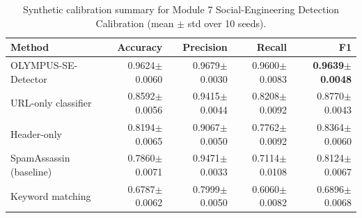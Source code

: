 \begin{table}[h]
\centering
\caption{Synthetic calibration summary for Module 7 Social-Engineering Detection Calibration (mean $\pm$ std over 10 seeds).}
\label{tab:module7_social_engineering}
\begin{tabular}{lrrrr}
\toprule
Method & Accuracy & Precision & Recall & F1 \\
\midrule
OLYMPUS-SE-Detector & 0.9624$\pm$0.0060 & 0.9679$\pm$0.0030 & 0.9600$\pm$0.0083 & \textbf{0.9639$\pm$0.0048} \\
URL-only classifier & 0.8592$\pm$0.0056 & 0.9415$\pm$0.0044 & 0.8208$\pm$0.0092 & 0.8770$\pm$0.0043 \\
Header-only & 0.8194$\pm$0.0065 & 0.9067$\pm$0.0050 & 0.7762$\pm$0.0092 & 0.8364$\pm$0.0060 \\
SpamAssassin (baseline) & 0.7860$\pm$0.0071 & 0.9471$\pm$0.0033 & 0.7114$\pm$0.0108 & 0.8124$\pm$0.0067 \\
Keyword matching & 0.6787$\pm$0.0062 & 0.7999$\pm$0.0050 & 0.6060$\pm$0.0082 & 0.6896$\pm$0.0068 \\
\bottomrule
\end{tabular}
\end{table}